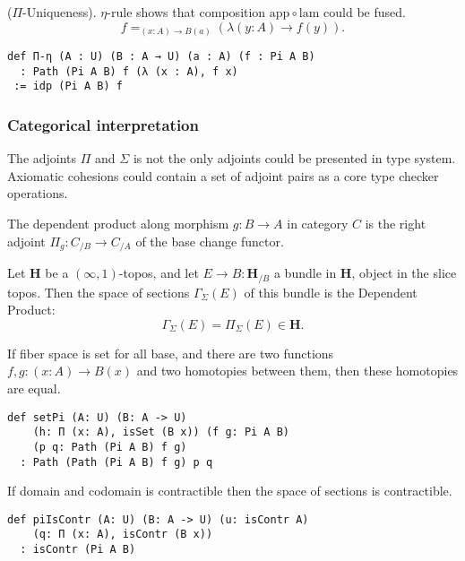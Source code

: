 \documentclass{article}
\begin{document}
\begin{theorem} ($\Pi$-Uniqueness).
$\eta$-rule shows that composition $\mathrm{app} \circ \mathrm{lam}$ could be fused.
$$ f =_{(x:A)\rightarrow B(a)} (\lambda (y:A) \rightarrow f(y)). $$
\begin{lstlisting}[mathescape=true]
def Π-η (A : U) (B : A → U) (a : A) (f : Pi A B)
  : Path (Pi A B) f (λ (x : A), f x)
 := idp (Pi A B) f
\end{lstlisting}
\end{theorem}

\subsubsection*{Categorical interpretation}

The adjoints $\Pi$ and $\Sigma$ is not the only adjoints could be presented in type system.
Axiomatic cohesions could contain a set of adjoint pairs as a core type checker operations.

\begin{definition}
The dependent product along morphism $g: B \rightarrow A$ in category $C$ is the right
adjoint $\Pi_g : C_{/B} \rightarrow C_{/A}$ of the base change functor.
\end{definition}

\begin{definition}
Let $\mathbf{H}$ be a $(\infty,1)$-topos, and let $E \rightarrow B : \mathbf{H}_{/B}$ a bundle in
$\mathbf{H}$, object in the slice topos. Then the space of sections $\Gamma_\Sigma(E)$
of this bundle is the Dependent Product:
$$ \Gamma_\Sigma(E) = \Pi_\Sigma (E) \in \mathbf{H}. $$
\end{definition}

\begin{theorem}
If fiber space is set for all base, and there are two functions
$f,g : (x:A) \rightarrow B(x)$ and two homotopies between them, then these homotopies are equal.
\begin{lstlisting}
def setPi (A: U) (B: A -> U)
    (h: П (x: A), isSet (B x)) (f g: Pi A B)
    (p q: Path (Pi A B) f g)
  : Path (Path (Pi A B) f g) p q
\end{lstlisting}
\end{theorem}

\begin{theorem}[Contractability]
If domain and codomain is contractible then the space of sections is contractible.
\begin{lstlisting}
def piIsContr (A: U) (B: A -> U) (u: isContr A)
    (q: П (x: A), isContr (B x))
  : isContr (Pi A B)
\end{lstlisting}
\end{theorem}
\end{document}
